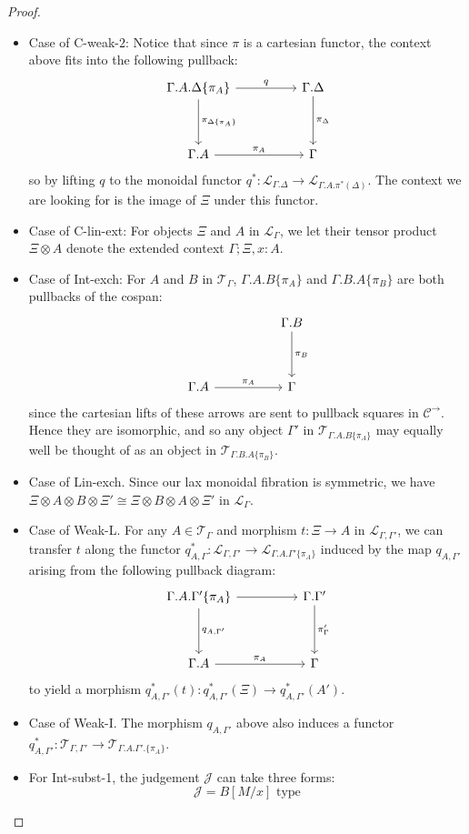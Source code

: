 \begin{thm}[Soundness]
\begin{proof}
\begin{itemize}
\item Case of C-weak-2: Notice that since $\pi$ is a cartesian functor, the context above fits into the following pullback:
\[
\ti
\Gamma.A.\Delta\{\pi_A\} \ar[r, "q"] \ar[d, "\pi_{\Delta\{\pi_A\}}"]  & \Gamma.\Delta \ar[d, "\pi_\Delta"]\\
\Gamma.A \ar[r, "\pi_A"] & \Gamma
\kz
\]
so by lifting $q$ to the monoidal functor $q^* : \mathcal{L}_{\Gamma.\Delta} \to \mathcal{L}_{\Gamma.A.\pi^*(\Delta)}$. The context we are looking for is the image of $\Xi$ under this functor.
\item Case of C-lin-ext: For objects $\Xi$ and $A$ in $\mathcal{L}_{\Gamma}$, we let their tensor product $\Xi \otimes A$ denote the extended context $\Gamma; \Xi, x : A$.
\item Case of Int-exch: For $A$ and $B$ in $\mathcal{T}_{\Gamma}$, $\Gamma.A.B\{\pi_A\}$ and $\Gamma.B.A\{\pi_B\}$ are both pullbacks of the cospan:
\[
\ti
& \Gamma.B \ar[d, "\pi_B"]\\
\Gamma.A \ar[r, "\pi_A"] & \Gamma
\kz
\]
since the cartesian lifts of these arrows are sent to pullback squares in $\mathcal{C}^\to$. Hence they are isomorphic, and so any object $\Gamma'$ in $\mathcal{T}_{\Gamma.A.B\{\pi_A\}}$ may equally well be thought of as an object in $\mathcal{T}_{\Gamma.B.A\{\pi_B\}}$.
\item Case of Lin-exch. Since our lax monoidal fibration is symmetric, we have $\Xi \otimes A \otimes B \otimes \Xi' \cong \Xi \otimes B \otimes A \otimes \Xi'$ in $\mathcal{L}_{\Gamma}$.
\item Case of Weak-L. For any $A \in \mathcal{T}_{\Gamma}$ and morphism $t : \Xi \to A$ in $\mathcal{L}_{\Gamma, \Gamma'}$, we can transfer $t$ along the functor $q_{A, \Gamma}^* : \mathcal{L}_{\Gamma, \Gamma'} \to \mathcal{L}_{\Gamma.A.\Gamma'\{\pi_A\}}$ induced by the map $q_{A, \Gamma'}$ arising from the following pullback diagram:
\[
\ti
\Gamma.A.\Gamma'\{\pi_A\} \ar[r] \ar[d, "q_{A, \Gamma'}"]  & \Gamma.\Gamma' \ar[d, "\pi_\Gamma'"]\\
\Gamma.A \ar[r, "\pi_A"] & \Gamma
\kz
\]
to yield a morphism $q_{A, \Gamma'}^*(t) : q_{A, \Gamma'}^*(\Xi) \to q_{A, \Gamma'}^*(A')$.
\item Case of Weak-I. The morphism $q_{A, \Gamma'}$ above also induces a functor $q_{A, \Gamma'}^* : \mathcal{T}_{\Gamma, \Gamma'} \to \mathcal{T}_{\Gamma.A.\Gamma'.\{\pi_A\}}$.
\item For Int-subst-1, the judgement $\mathcal{J}$ can take three forms:
\[
\mathcal{J} = B[M/x] \text{ type}
\]
\[
\]
\end{itemize}
\end{proof}
\end{thm}
